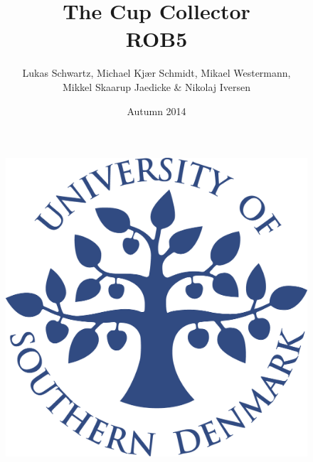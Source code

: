 \title{The Cup Collector \\ROB5}
\author{Lukas Schwartz, Michael Kjær Schmidt, Mikael Westermann, \\Mikkel Skaarup Jaedicke \& Nikolaj Iversen}
\date{Autumn 2014}
\begin{figure}
\centering
\includegraphics[width=1\textwidth]{graphics/forside.png}
\end{figure}
\maketitle

